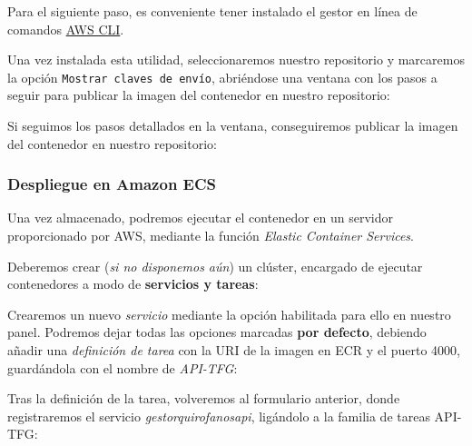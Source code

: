 
Para el siguiente paso, es conveniente tener instalado el gestor en línea de comandos \href{https://docs.aws.amazon.com/es_es/cli/latest/userguide/getting-started-install.html}{AWS CLI}.

Una vez instalada esta utilidad, seleccionaremos nuestro repositorio y marcaremos la opción \texttt{Mostrar claves de envío}, abriéndose una ventana con los pasos a seguir para publicar la imagen del contenedor en nuestro repositorio:


Si seguimos los pasos detallados en la ventana, conseguiremos publicar la imagen del contenedor en nuestro repositorio:


\subsubsection{Despliegue en Amazon ECS}

Una vez almacenado, podremos ejecutar el contenedor en un servidor proporcionado por AWS, mediante la función \textit{Elastic Container Services}.

Deberemos crear (\textit{si no disponemos aún}) un clúster, encargado de ejecutar contenedores a modo de \textbf{servicios y tareas}:



Crearemos un nuevo \textit{servicio} mediante la opción habilitada para ello en nuestro panel. Podremos dejar todas las opciones marcadas \textbf{por defecto}, debiendo añadir una \textit{definición de tarea} con la URI de la imagen en ECR y el puerto 4000, guardándola con el nombre de \textit{API-TFG}:


Tras la definición de la tarea, volveremos al formulario anterior, donde registraremos el servicio \textit{gestorquirofanosapi}, ligándolo a la familia de tareas API-TFG:


